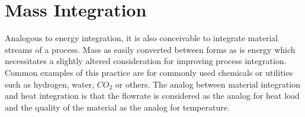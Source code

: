 \section{Mass Integration}

Analogous to energy integration, it is also conceivable to integrate material streams of a process. Mass as easily converted between forms as is energy which necessitates a slightly altered consideration for improving process integration. Common examples of this practice are for commonly used chemicals or utilities such as hydrogen, water, $CO_2$ or others. The analog between material integration and heat integration is that the flowrate is considered as the analog for heat load and the quality of the material as the analog for temperature. 